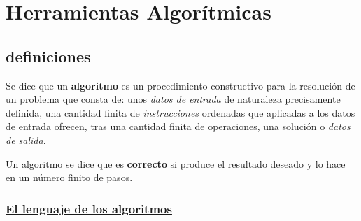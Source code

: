 \documentclass[twoside]{report}
\begin{document}
\section{Herramientas Algorítmicas}

\subsection{definiciones}

\begin{defi}
Se dice que un \textbf{algoritmo} es un procedimiento constructivo para la resoluci\'{o}n de un problema que consta de: unos \emph{datos de entrada} de naturaleza precisamente definida, una cantidad finita de \emph{instrucciones} ordenadas que aplicadas a los datos de entrada ofrecen, tras una cantidad finita de operaciones, una soluci\'{o}n o \emph{datos de salida}.
\end{defi}

\begin{defi}
Un algoritmo se dice que es \textbf{correcto} si produce el resultado deseado y lo hace en un n\'{u}mero finito de pasos.
\end{defi}


\subsubsection{\underline{El lenguaje de los algoritmos}}
\end{document}
